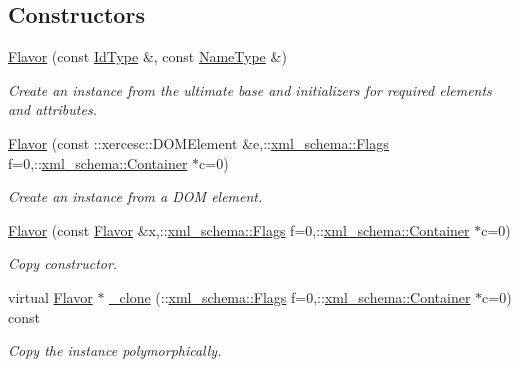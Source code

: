 \subsection*{Constructors}
\begin{DoxyCompactItemize}
\item 
\hypertarget{classopenstack_1_1xml_1_1Flavor_adaea90f5903dbe64197602bf429e8d3d}{
\hyperlink{classopenstack_1_1xml_1_1Flavor_adaea90f5903dbe64197602bf429e8d3d}{Flavor} (const \hyperlink{classopenstack_1_1xml_1_1Flavor_a5f67ffcd9c22c43c1b57ff8c8f169bf1}{IdType} \&, const \hyperlink{classopenstack_1_1xml_1_1Flavor_ac4a08c9c1f4a86e464e1ef19e62b776d}{NameType} \&)}
\label{classopenstack_1_1xml_1_1Flavor_adaea90f5903dbe64197602bf429e8d3d}

\begin{DoxyCompactList}\small\item\em Create an instance from the ultimate base and initializers for required elements and attributes. \item\end{DoxyCompactList}\item 
\hyperlink{classopenstack_1_1xml_1_1Flavor_ab6d9a3886f3337c60dc3e717e3fea184}{Flavor} (const ::xercesc::DOMElement \&e,::\hyperlink{namespacexml__schema_affb4c227cbd9aa7453dd1dc5a1401943}{xml\_\-schema::Flags} f=0,::\hyperlink{namespacexml__schema_a333dea2213742aea47a37532dec4ec27}{xml\_\-schema::Container} $\ast$c=0)
\begin{DoxyCompactList}\small\item\em Create an instance from a DOM element. \item\end{DoxyCompactList}\item 
\hyperlink{classopenstack_1_1xml_1_1Flavor_a82da51c44f515fbbef52c96a325f6199}{Flavor} (const \hyperlink{classopenstack_1_1xml_1_1Flavor}{Flavor} \&x,::\hyperlink{namespacexml__schema_affb4c227cbd9aa7453dd1dc5a1401943}{xml\_\-schema::Flags} f=0,::\hyperlink{namespacexml__schema_a333dea2213742aea47a37532dec4ec27}{xml\_\-schema::Container} $\ast$c=0)
\begin{DoxyCompactList}\small\item\em Copy constructor. \item\end{DoxyCompactList}\item 
virtual \hyperlink{classopenstack_1_1xml_1_1Flavor}{Flavor} $\ast$ \hyperlink{classopenstack_1_1xml_1_1Flavor_ab1108f9462a281005c6d77b1738fb25c}{\_\-clone} (::\hyperlink{namespacexml__schema_affb4c227cbd9aa7453dd1dc5a1401943}{xml\_\-schema::Flags} f=0,::\hyperlink{namespacexml__schema_a333dea2213742aea47a37532dec4ec27}{xml\_\-schema::Container} $\ast$c=0) const 
\begin{DoxyCompactList}\small\item\em Copy the instance polymorphically. \item\end{DoxyCompactList}\end{DoxyCompactItemize}


